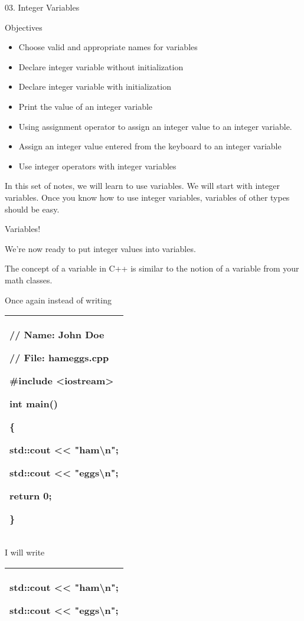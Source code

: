 \documentclass[
]{article}
\author{}
\date{}
\providecommand{\tightlist}{%
  \setlength{\itemsep}{0pt}\setlength{\parskip}{0pt}}
\begin{document}
03. Integer Variables

Objectives

\begin{itemize}
\tightlist
\item
  Choose valid and appropriate names for variables
\item
  Declare integer variable without initialization
\item
  Declare integer variable with initialization
\item
  Print the value of an integer variable
\item
  Using assignment operator to assign an integer value to an integer
  variable.
\item
  Assign an integer value entered from the keyboard to an integer
  variable
\item
  Use integer operators with integer variables
\end{itemize}

In this set of notes, we will learn to use variables. We will start with
integer variables. Once you know how to use integer variables, variables
of other types should be easy.

Variables!

We're now ready to put integer values into variables.

The concept of a variable in C++ is similar to the notion of a variable
from your math classes.

Once again instead of writing

\begin{longtable}[]{@{}l@{}}
\toprule
\endhead
\begin{minipage}[t]{0.97\columnwidth}\raggedright
// Name: John Doe

// File: hameggs.cpp

\#include \textless iostream\textgreater{}

int main()

\{

std::cout \textless\textless{} "ham\textbackslash n";

std::cout \textless\textless{} "eggs\textbackslash n";

return 0;

\}\strut
\end{minipage}\tabularnewline
\bottomrule
\end{longtable}

I will write

\begin{longtable}[]{@{}l@{}}
\toprule
\endhead
\begin{minipage}[t]{0.97\columnwidth}\raggedright
std::cout \textless\textless{} "ham\textbackslash n";

std::cout \textless\textless{} "eggs\textbackslash n";\strut
\end{minipage}\tabularnewline
\bottomrule
\end{longtable}
\end{document}
